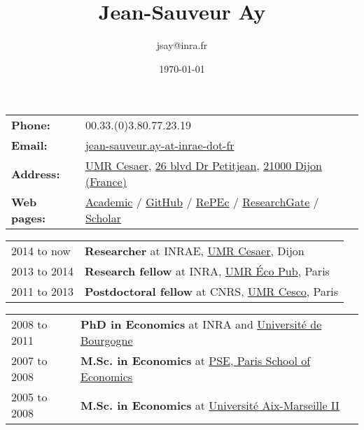 \documentclass[11pt, a4paper]{./style}
\author{jsay@inra.fr}
\date{\today}
\title{Jean-Sauveur Ay}
\begin{document}
\maketitle


\label{sec:orgf13579d}

\begin{center}
\begin{tabular}{ll}
\textbf{Phone:} & 00.33.(0)3.80.77.23.19\\[0pt]
\textbf{Email:} & \href{mailto:jean-sauveur.ay@inrae.fr}{jean-sauveur.ay-at-inrae-dot-fr}\\[0pt]
\textbf{Address:} & \href{https://www2.dijon.inrae.fr/cesaer/en/axis/}{UMR Cesaer}, \href{https://www.google.com/maps/?q\%3D47.3097819,5.0644835}{26 blvd Dr Petitjean}, \href{https://www.google.com/maps/place/21000+Dijon/}{21000 Dijon (France)}\\[0pt]
\textbf{Web pages:} & \href{https://www2.dijon.inrae.fr/cesaer/membres/jean-sauveur-ay/}{Academic} / \href{http://github.com/jsay/}{GitHub} / \href{https://ideas.repec.org/e/pay77.html}{RePEc} / \href{https://www.researchgate.net/profile/Jean\_Sauveur\_Ay}{ResearchGate} / \href{https://scholar.google.fr/citations?user=arEwxlIAAAAJ\&hl=fr}{Scholar}\\[0pt]
\end{tabular}
\end{center}

\label{sec:org8ea453f}

\begin{center}
\begin{tabular}{ll}
2014 to now & \textbf{Researcher} at INRAE, \href{https://www2.dijon.inrae.fr/cesaer/en/axis/}{UMR Cesaer}, Dijon\\[0pt]
2013 to 2014 & \textbf{Research fellow} at INRA, \href{https://www6.versailles-grignon.inrae.fr/economie\_publique\_eng/}{UMR Éco Pub}, Paris\\[0pt]
2011 to 2013 & \textbf{Postdoctoral fellow} at CNRS, \href{http://cesco.mnhn.fr/en}{UMR Cesco}, Paris\\[0pt]
\end{tabular}
\end{center}

\label{sec:orga4ed2c1}

\begin{center}
\begin{tabular}{ll}
2008 to 2011 & \textbf{PhD in Economics} at INRA and \href{http://en.u-bourgogne.fr/}{Université de Bourgogne}\\[0pt]
2007 to 2008 & \textbf{M.Sc. in Economics} at \href{https://www.parisschoolofeconomics.eu/en/}{PSE, Paris School of Economics}\\[0pt]
2005 to 2008 & \textbf{M.Sc. in Economics} at \href{https://www.amse-aixmarseille.fr/en}{Université Aix-Marseille II}\\[0pt]
\end{tabular}
\end{center}
\end{document}
